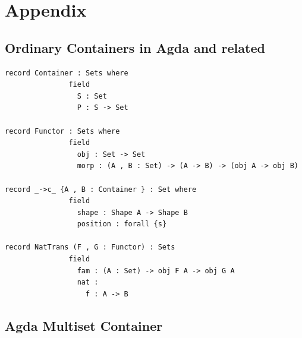 \documentclass[12pt]{report}
\begin{document}
\chapter{Appendix}
\section{Ordinary Containers in Agda and related}
\begin{verbatim}
record Container : Sets where
               field
                 S : Set
                 P : S -> Set
                 
record Functor : Sets where
               field
                 obj : Set -> Set
                 morp : (A , B : Set) -> (A -> B) -> (obj A -> obj B)                 

record _->c_ {A , B : Container } : Set where
               field
                 shape : Shape A -> Shape B
                 position : forall {s} 
                 
record NatTrans (F , G : Functor) : Sets
               field
                 fam : (A : Set) -> obj F A -> obj G A 
                 nat : 
                   f : A -> B                 

\end{verbatim}
\section{Agda Multiset Container}
\end{document}
